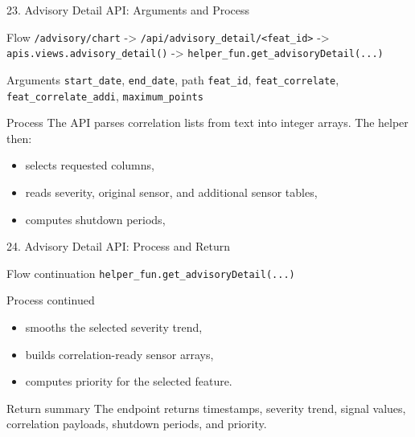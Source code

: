 \documentclass[aspectratio=169]{beamer}
\begin{document}
\begin{frame}{23. Advisory Detail API: Arguments and Process}
\justifying
\begin{block}{Flow}
\texttt{/advisory/chart} -> \texttt{/api/advisory\_detail/<feat\_id>} ->
\texttt{apis.views.advisory\_detail()} ->
\texttt{helper\_fun.get\_advisoryDetail(...)}
\end{block}

\begin{block}{Arguments}
\texttt{start\_date}, \texttt{end\_date}, path \texttt{feat\_id},
\texttt{feat\_correlate}, \texttt{feat\_correlate\_addi},
\texttt{maximum\_points}
\end{block}

\begin{block}{Process}
The API parses correlation lists from text into integer arrays.
The helper then:
\begin{itemize}
    \item selects requested columns,
    \item reads severity, original sensor, and additional sensor tables,
    \item computes shutdown periods,
\end{itemize}
\end{block}
\end{frame}

\begin{frame}{24. Advisory Detail API: Process and Return}
\justifying
\begin{block}{Flow continuation}
\texttt{helper\_fun.get\_advisoryDetail(...)}
\end{block}

\begin{block}{Process continued}
\begin{itemize}
    \item smooths the selected severity trend,
    \item builds correlation-ready sensor arrays,
    \item computes priority for the selected feature.
\end{itemize}
\end{block}

\begin{block}{Return summary}
The endpoint returns timestamps, severity trend, signal values, correlation payloads, shutdown periods, and priority.
\end{block}
\end{frame}
\end{document}
